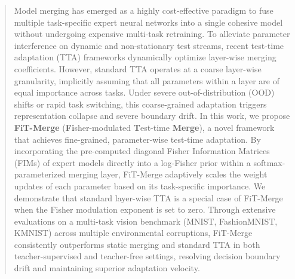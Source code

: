 \documentclass{article}
\theoremstyle{plain}
\theoremstyle{definition}
\theoremstyle{remark}
\begin{document}

\printAffiliationsAndNotice{}

\begin{abstract}
  Model merging has emerged as a highly cost-effective paradigm to fuse multiple task-specific expert neural networks into a single cohesive model without undergoing expensive multi-task retraining. To alleviate parameter interference on dynamic and non-stationary test streams, recent test-time adaptation (TTA) frameworks dynamically optimize layer-wise merging coefficients. However, standard TTA operates at a coarse layer-wise granularity, implicitly assuming that all parameters within a layer are of equal importance across tasks. Under severe out-of-distribution (OOD) shifts or rapid task switching, this coarse-grained adaptation triggers representation collapse and severe boundary drift. In this work, we propose \textbf{FiT-Merge} (\textbf{Fi}sher-modulated \textbf{T}est-time \textbf{Merge}), a novel framework that achieves fine-grained, parameter-wise test-time adaptation. By incorporating the pre-computed diagonal Fisher Information Matrices (FIMs) of expert models directly into a log-Fisher prior within a softmax-parameterized merging layer, FiT-Merge adaptively scales the weight updates of each parameter based on its task-specific importance. We demonstrate that standard layer-wise TTA is a special case of FiT-Merge when the Fisher modulation exponent is set to zero. Through extensive evaluations on a multi-task vision benchmark (MNIST, FashionMNIST, KMNIST) across multiple environmental corruptions, FiT-Merge consistently outperforms static merging and standard TTA in both teacher-supervised and teacher-free settings, resolving decision boundary drift and maintaining superior adaptation velocity.
\end{abstract}
\end{document}
